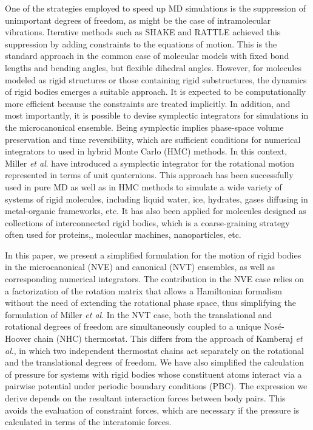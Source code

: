 \documentclass[aip,jcp,reprint,amsmath,amssymb,amsfont]{revtex4-1}
\begin{document}
One of the strategies employed to speed up MD simulations is the suppression of unimportant degrees of freedom, as might be the case of intramolecular vibrations. Iterative methods such as SHAKE\cite{Ryckaert1977} and RATTLE\cite{Andersen1983} achieved this suppression by adding constraints to the equations of motion. This is the standard approach in the common case of molecular models with fixed bond lengths and bending angles, but flexible dihedral angles. However, for molecules modeled as rigid structures or those containing rigid substructures,\cite{Miller2002} the dynamics of rigid bodies emerges a suitable approach. It is expected to be computationally more efficient because the constraints are treated implicitly. In addition, and most importantly, it is possible to devise symplectic integrators for simulations in the microcanonical ensemble. Being symplectic implies phase-space volume preservation and time reversibility, which are sufficient conditions for numerical integrators to used in hybrid Monte Carlo (HMC) methods.\cite{Duane1987} In this context, Miller \textit{et al}.\cite{Miller2002} have introduced a symplectic integrator for the rotational motion represented in terms of unit quaternions. This approach has been successfully used in pure MD as well as in HMC methods to simulate a wide variety of systems of rigid molecules, including liquid water,\cite{Sakamaki2011, Reinhardt2012, Palmer2014, Gonzales2014} ice,\cite{Geiger2014} hydrates,\cite{Tribello2009, Gorman2012} gases diffusing in metal-organic frameworks,\cite{Ghoufi2010} etc. It has also been applied for molecules designed as collections of interconnected rigid bodies, which is a coarse-graining strategy often used for proteins,\cite{Terada2003}, molecular machines,\cite{Akimov2008, Konyukhov2010} nanoparticles,\cite{Knorowski2012, Patra2013} etc.

In this paper, we present a simplified formulation for the motion of rigid bodies in the microcanonical (NVE) and canonical (NVT) ensembles, as well as corresponding numerical integrators. The contribution in the NVE case relies on a factorization of the rotation matrix that allows a Hamiltonian formalism without the need of extending the rotational phase space, thus simplifying the formulation of Miller \textit{et al}.\cite{Miller2002} In the NVT case, both the translational and rotational degrees of freedom are simultaneously coupled to a unique Nos\'{e}-Hoover chain (NHC) thermostat. This differs from the approach of Kamberaj \textit{et al}.,\cite{Kamberaj2005} in which two independent thermostat chains act separately on the rotational and the translational degrees of freedom. We have also simplified the calculation of pressure for systems with rigid bodies whose constituent atoms interact via a pairwise potential under periodic boundary conditions (PBC). The expression we derive depends on the resultant interaction forces between body pairs. This avoids the evaluation of constraint forces, which are necessary if the pressure is calculated in terms of the interatomic forces.
\end{document}

